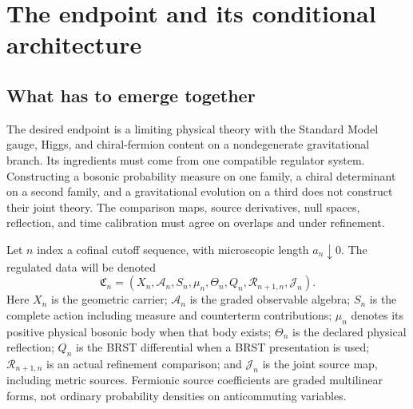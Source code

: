 \documentclass[11pt,a4paper,oneside]{book}
\theoremstyle{plain}
\theoremstyle{definition}
\theoremstyle{remark}
\renewcommand{\AA}{\mathcal A}
\begin{document}
\chapter{The endpoint and its conditional architecture}
\label{ch:architecture}
\section{What has to emerge together}
The desired endpoint is a limiting physical theory with the Standard Model gauge, Higgs, and chiral-fermion content on a nondegenerate gravitational branch. Its ingredients must come from one compatible regulator system. Constructing a bosonic probability measure on one family, a chiral determinant on a second family, and a gravitational evolution on a third does not construct their joint theory. The comparison maps, source derivatives, null spaces, reflection, and time calibration must agree on overlaps and under refinement.

Let $n$ index a cofinal cutoff sequence, with microscopic length $a_n\downarrow0$. The regulated data will be denoted
\begin{equation}
 \mathfrak C_n=(X_n,\AA_n,S_n,\mu_n,\Theta_n,Q_n,\mathcal R_{n+1,n},\mathcal J_n).
 \label{eq:common-card}
\end{equation}
Here $X_n$ is the geometric carrier; $\AA_n$ is the graded observable algebra; $S_n$ is the complete action including measure and counterterm contributions; $\mu_n$ denotes its positive physical bosonic body when that body exists; $\Theta_n$ is the declared physical reflection; $Q_n$ is the BRST differential when a BRST presentation is used; $\mathcal R_{n+1,n}$ is an actual refinement comparison; and $\mathcal J_n$ is the joint source map, including metric sources. Fermionic source coefficients are graded multilinear forms, not ordinary probability densities on anticommuting variables.
\end{document}
